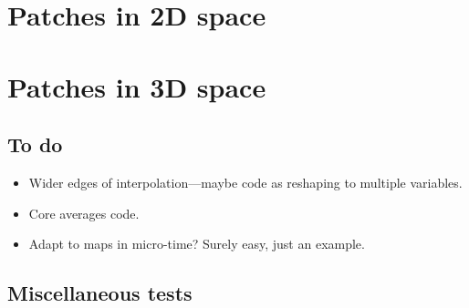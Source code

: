 




\begin{devMan}

%



\end{devMan}










\chapter{Patches in 2D space}



\begin{devMan}



\end{devMan}







\chapter{Patches in 3D space}








\begin{devMan}

\section{To do}
\begin{itemize}
\item Wider edges of interpolation---maybe code as reshaping to multiple variables.
\item Core averages code.
\item Adapt to maps in micro-time?  Surely easy, just an example.
\end{itemize}


\section{Miscellaneous tests}




\end{devMan}
